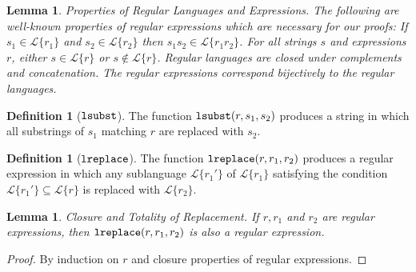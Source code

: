 \documentclass{acm_proc_article-sp}
\newtheorem{lem}[thm]{Lemma}
\theoremstyle{definition}
\newtheorem{defn}[thm]{Definition}
\newcommand{\Lagr}{\mathcal{L}}
\newcommand{\lang}[1]{\Lagr\{#1\}}
\newcommand{\lsubst}[3]{{\tt lsubst}(#1,#2,#3)} %
\newcommand{\lreplace}[3]{{\tt lreplace}(#1, #2, #3)}
\begin{document}
\begin{lem}{Properties of Regular Languages and Expressions.} \label{thm:regexprops}
The following are well-known properties of regular expressions which are necessary for our proofs:
If $s_1 \in \lang{r_1}$ and $s_2 \in \lang{r_2}$ then $s_1s_2 \in \lang{r_1r_2}$.
For all strings $s$ and expressions $r$, either $s \in \lang{r}$ or $s \not \in \lang{r}$.
Regular languages are closed under complements and concatenation.
The regular expressions correspond bijectively to the regular languages.
\end{lem}

\begin{defn}[$\tt{lsubst}$]
The function $\lsubst{r}{s_1}{s_2}$ produces a string in which all substrings of $s_1$ matching $r$ are replaced with $s_2$.
\end{defn}

\begin{defn}[$\tt{lreplace}$]
The function $\lreplace{r}{r_1}{r_2}$ produces a regular expression in which any sublanguage $\lang{r_1'}$ of $\lang{r_1}$ satisfying the condition $\lang{r_1'} \subseteq{\lang{r}}$ is replaced with $\lang{r_2}$.
\end{defn}

\begin{lem}{Closure and Totality of Replacement.} \label{thm:total}
If $r, r_1$ and $r_2$ are regular expressions, then $\lreplace{r}{r_1}{r_2}$ is also a regular expression.
\end{lem}
\begin{proof}
By induction on $r$ and closure properties of regular expressions.
\end{proof}
\end{document}
